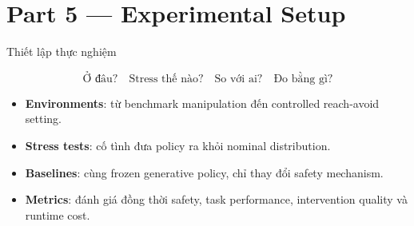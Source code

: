 \documentclass[aspectratio=169]{beamer}
\begin{document}
\section{Part 5 --- Experimental Setup}

\begin{frame}[t,shrink=8]{Thiết lập thực nghiệm}

\begin{center}

\Large
\[
\boxed{
\text{Ở đâu?}
\quad
\boxed{\text{Stress thế nào?}}
\quad
\boxed{\text{So với ai?}}
\quad
\boxed{\text{Đo bằng gì?}}
}
\]

\end{center}

\vspace{8pt}

\begin{itemize}
    \item \textbf{Environments}: từ benchmark manipulation đến controlled
    reach-avoid setting.

    \item \textbf{Stress tests}: cố tình đưa policy ra khỏi nominal
    distribution.

    \item \textbf{Baselines}: cùng frozen generative policy, chỉ thay đổi
    safety mechanism.

    \item \textbf{Metrics}: đánh giá đồng thời safety, task performance,
    intervention quality và runtime cost.
\end{itemize}

\end{frame}
\end{document}
